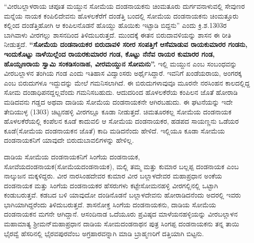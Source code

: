 \vskip 2pt

“ವೀರಬಲ್ಲಾಳರಾಯ ಚಪೂತ ಮಯ್ದುನ ಸೋಮೆಯ ದಂಡನಾಯಕನು ಚಿಂಮತೂರು ದುರ್ಗವನಾಳುವಲ್ಲಿ ಸೇವುಣರ ಮನ್ನೆಯ ನಾಯಕ ಕಂಪಿಲಿದೇವನು ಹೊಳಲಕೆರೆಗೆ ದಂಡೆತ್ತಿ ಬಂದಲ್ಲಿ ಸೋಮೆಯ ದಂಡನಾಯಕನು ಚಿಂಮತ್ತೂರು ಕಲ್ಲಿಂದ ದಂಡೆತ್ತಿಹೋಗಿ ಆ ಕಂಪಿಲನೊಡನೆ ಹೊಯ್ದು ಹೊಯಿಕು ಇಟ್ಟಾಡಿ ಬಿದ್ದನು” ಎಂದು ಕ್ರಿ.ಶ.1303ರ ಬಾಗಿವಾಳು ವೀರಗಲ್ಲು ಶಾಸನದಿಂದ ತಿಳಿದುಬರುತ್ತದೆ. ಮುಂದಕ್ಕೆ ಈತನ ಬಿರುದಾವಳಿಯನ್ನು ಶಾಸನ ಈ ರೀತಿ ನೀಡುತ್ತದೆ. \textbf{“ಸೋಮೆಯ ದಂಡನಾಯಕರ ಬಿರುದಾವಳಿ ಸರೀರ ಸಂಪತ್ತಿಗೆ ಆಸೆಮಾಡುವ ರಾಯಕುಮಾರರ ಗಂಡನು, ಇಂದುಕೊಟ್ಟು ನಾಳೆಯಿಲ್ಲೆಂದ ರಾಯರಕುಮಾರರ ಗಂಡ, ಕೊಟ್ಟು ನೆನೆವ ರಾಯರ ಕುಮಾರರ ಗಂಡ, ಹೊಯ್ಸಣರಾಯ ಸ್ವಾಮಿ ಸಂಕಡಿಸಂನಾಹ,\general{\break } ವೀರಮಯ್ದುನ ಸೋಮನು”.} ಇಲ್ಲಿ ಮಯ್ದುನ ಎಂಬ ಸಂಬಂಧವನ್ನು ವೀರಬಲ್ಲಾಳನ ತಂಗಿಯ ಗಂಡ ಎಂದು ಇತಿಹಾಸ ವಿದ್ವಾಂಸರು ಅರ್ಥೈಸಿದ್ದಾರೆ. ಇವನಿಗೆ ಖಂಡೆಯರಾಯ, ಅಂಗರಕ್ಕ ಎಂಬ ಬಿರುದುಗಳೂ ಇದ್ದುದನ್ನು ಮೇಲೆ ಗಮನಿಸಲಾಗಿದೆ. ಈ ಬಿರುದುಗಳಾವುವೂ ಮೂರನೇ ನರಸಿಂಹನ ಕಾಲದಲ್ಲಿದ್ದ ಸೋಮ ದಂಡಾಧಿಪನದ್ದಲ್ಲವೆಂದು ಗಮನಿಸಬಹುದು. ಆದುದರಿಂದ ಹೊಳಲಕೆರೆಯ ಕಂಪಿಲನ ಜೊತೆ ಹೋರಾಡಿ ಮಡಿದವನು ಗಡ್ಡದ ಅಥವಾ ದಾಡಿಯ ಸೋಮೆಯ ದಂಡನಾಯಕನೇ ಆಗಿರಬಹುದು. ಈ ಘಟನೆಯನ್ನು ಇದೇ ತೇದಿಯುಳ್ಳ (1303) ಚಿಟ್ಟನಹಳ್ಳಿ ವೀರಗಲ್ಲೂ ಕೂಡಾ ನೀಡುತ್ತದೆ. ಚಿಮತೂರಕಲ್ಲ ಸೋಮೆಯ ದಂಡನಾಯಕ ಹೊಳಲಕೆರೆಯಲ್ಲಿ ಕಂಪೆಲನ ಕೂಡೆ ಕಾದುವಲಿ ಆ ಸೋಮೆಯ ದಂಡನಾಯಕರ, ಹಡಪದ ಸಾಯಣ್ಣನು ಒಡೆಯರ ಕೂಡೆ(ಸೋಮೆಯ ದಂಡನಾಯಕನ ಜೊತೆ) ಕಾದಿ ಮಡಿದನೆಂದು ಹೇಳಿದೆ. ಇಲ್ಲಿಯೂ ಕೂಡಾ ಸೋಮೆಯ ದಂಡನಾಯಕನಿಗೆ ಯಾವುದೇ ಬಿರುದುಬಾವಲಿಗಳನ್ನು ಹೇಳಿಲ್ಲ.

\vskip 2pt

ದಾಡಿಯ ಸೋಮೆಯ ದಂಡನಾಯಕನಿಗೆ ಸಿಂಗೆಯ ದಂಡನಾಯಕ, ಸೋವೆಯದಂಡನಾಯಕ(ಸೋಮೆಯ\break ದಂಡನಾಯಕ), ಮಲ್ಲಿ ತಮ್ಮ ಮತ್ತು ಕುಮಾರ ಬಲ್ಲಪ್ಪ ದಂಡನಾಯಕ ಎಂಬ ನಾಲ್ಕುಜನ ಮಕ್ಕಳಿದ್ದರು. ವೀರ ನಾರಸಿಂಹದೇವರ ಕುಮಾರ ವೀರ ಬಲ್ಲಾಳದೇವರ ಮಹಾಪ್ರಧಾನ ಅಂಕೆಯ ದಂಡನಾಯಕ ಮತ್ತು ಸಿಂಗೆಯ ದಂಡನಾಯಕರ ಹೆಸರುಗಳು ಕಟ್ಟೇಸೋಮನಹಳ್ಳಿ ವೀರಗಲ್ಲಿನಲ್ಲಿ ಒಟ್ಟಾಗಿ ಕಂಡುಬರುತ್ತವೆ. ಕಡಬದ ಬಳಿ ಯಾವುದೋ ದಂಡಿನೊಡನೆ ಬಲ್ಲಾಳದೇವನು ಹೋರಾಡಿದನೆಂದು ಅದರಲ್ಲಿ ಇವರು ಭಾಗಿಯಾಗಿದ್ದರೆಂದು ತಿಳಿದುಬರುತ್ತದೆ. ಶಾಸನೋಕ್ತ ಸಿಂಗೆಯ ದಂಡನಾಯಕನು, ದಾಡಿಯ ಸೋಮೆಯ ದಂಡನಾಯಕನ ಮಗನೇ ಆಗಿದ್ದಾನೆ. ಆಸಂದಿನಾಡ ಒದೆಯೂರು ಪ್ರವಿಷ್ಠದ ಮಾಳೆಯನಹಳ್ಳಿಯನ್ನು ವೀರಬಲ್ಲಾಳನ ಮಹಾಮಾತ್ಯ ಶ‍್ರೀಮನ್​ಮಹಾಪ್ರಧಾನ ದಾಡಿಯ ಸೋಮದಂಡನಾಥನ ಪುತ್ರ ಸಿಂಗಪ್ಪ ದಂಡನಾಯಕನು ತನ್ನ ತಾಯಿ ಭೈರವ್ವೆ ಹೆಸರಿನಲ್ಲಿ ಭೈರವಪುರವೆಂಬ ಅಗ್ರಹಾರವನ್ನಾಗಿ ಮಾಡಿ ಬ್ರಾಹ್ಮಣರಿಗೆ ದತ್ತಿಯಾಗಿ ಬಿಟ್ಟನು.

\vskip 2pt

